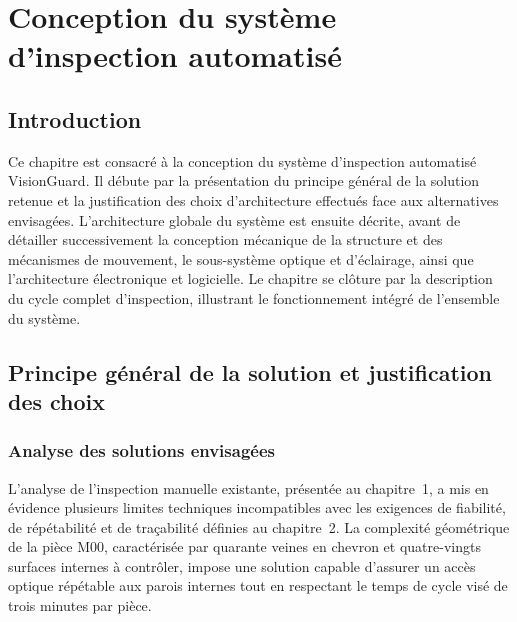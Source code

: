 
\chapter{Conception du système d'inspection automatisé}

\section{Introduction}

Ce chapitre est consacré à la conception du système d'inspection automatisé VisionGuard.
Il débute par la présentation du principe général de la solution retenue et la justification
des choix d'architecture effectués face aux alternatives envisagées. L'architecture globale
du système est ensuite décrite, avant de détailler successivement la conception mécanique
de la structure et des mécanismes de mouvement, le sous-système optique et d'éclairage,
ainsi que l'architecture électronique et logicielle. Le chapitre se clôture par la description
du cycle complet d'inspection, illustrant le fonctionnement intégré de l'ensemble du système.

\section{Principe général de la solution et justification des choix}

\subsection{Analyse des solutions envisagées}

L'analyse de l'inspection manuelle existante, présentée au chapitre~1, a mis en évidence
plusieurs limites techniques incompatibles avec les exigences de fiabilité, de répétabilité
et de traçabilité définies au chapitre~2. La complexité géométrique de la pièce M00,
caractérisée par quarante veines en chevron et quatre-vingts surfaces internes à contrôler,
impose une solution capable d'assurer un accès optique répétable aux parois internes tout
en respectant le temps de cycle visé de trois minutes par pièce.

